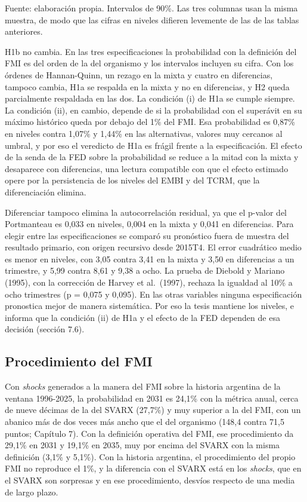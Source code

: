 Fuente: elaboración propia. Intervalos de 90\%. Las tres columnas usan
la misma muestra, de modo que las cifras en niveles difieren levemente
de las de las tablas anteriores.

H1b no cambia. En las tres especificaciones la probabilidad con la
definición del FMI es del orden de la del organismo y los intervalos
incluyen su cifra. Con los órdenes de Hannan-Quinn, un rezago en la
mixta y cuatro en diferencias, tampoco cambia, H1a se respalda en la
mixta y no en diferencias, y H2 queda parcialmente respaldada en las
dos. La condición (i) de H1a se cumple siempre. La condición (ii), en
cambio, depende de si la probabilidad con el superávit en su máximo
histórico queda por debajo del 1\% del FMI. Esa probabilidad es 0,87\%
en niveles contra 1,07\% y 1,44\% en las alternativas, valores muy
cercanos al umbral, y por eso el veredicto de H1a es frágil frente a la
especificación. El efecto de la senda de la FED sobre la probabilidad se
reduce a la mitad con la mixta y desaparece con diferencias, una lectura
compatible con que el efecto estimado opere por la persistencia de los
niveles del EMBI y del TCRM, que la diferenciación elimina.

Diferenciar tampoco elimina la autocorrelación residual, ya que el
p-valor del Portmanteau es 0,033 en niveles, 0,004 en la mixta y 0,041
en diferencias. Para elegir entre las especificaciones se comparó su
pronóstico fuera de muestra del resultado primario, con origen recursivo
desde 2015T4. El error cuadrático medio es menor en niveles, con 3,05
contra 3,41 en la mixta y 3,50 en diferencias a un trimestre, y 5,99
contra 8,61 y 9,38 a ocho. La prueba de Diebold y Mariano (1995), con la
corrección de Harvey et al.~(1997), rechaza la igualdad al 10\% a ocho
trimestres (p = 0,075 y 0,095). En las otras variables ninguna
especificación pronostica mejor de manera sistemática. Por eso la tesis
mantiene los niveles, e informa que la condición (ii) de H1a y el efecto
de la FED dependen de esa decisión (sección 7.6).

\subsection{Procedimiento del FMI}

Con \emph{shocks} generados a la manera del FMI sobre la historia
argentina de la ventana 1996-2025, la probabilidad en 2031 es 24,1\% con
la métrica anual, cerca de nueve décimas de la del SVARX (27,7\%) y muy
superior a la del FMI, con un abanico más de dos veces más ancho que el
del organismo (148,4 contra 71,5 puntos; Capítulo 7). Con la definición
operativa del FMI, ese procedimiento da 29,1\% en 2031 y 19,1\% en 2035,
muy por encima del SVARX con la misma definición (3,1\% y 5,1\%). Con la
historia argentina, el procedimiento del propio FMI no reproduce el 1\%,
y la diferencia con el SVARX está en los \emph{shocks}, que en el SVARX
son sorpresas y en ese procedimiento, desvíos respecto de una media de
largo plazo.

